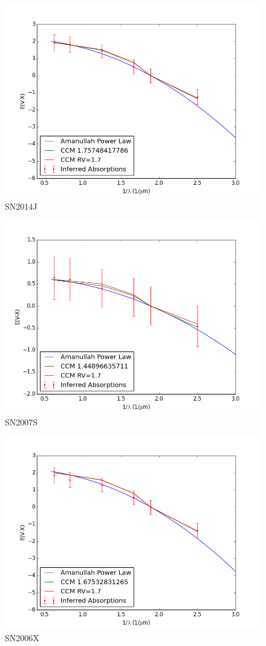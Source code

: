 \documentclass{article}
\begin{document}
\begin{figure}
\includegraphics[width=.8\textwidth]{../2014j_redlaw.png}
\caption{SN2014J}
\end{figure}
\begin{figure}
\includegraphics[width=.8\textwidth]{../2007S_redlaw.png}
\caption{SN2007S}
\end{figure}

\begin{figure}
\includegraphics[width=.8\textwidth]{../2006X_redlaw.png}
\caption{SN2006X}
\end{figure}
\end{document}
